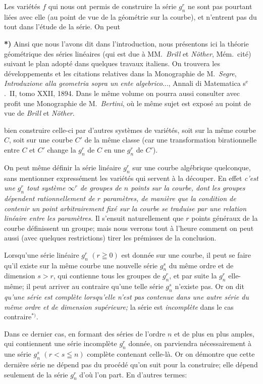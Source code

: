\documentclass{article}
\begin{document}
Les variétés $f$ qui nous ont permis de construire la série $g_{n}^{r}$ ne sont pas pourtant liées avec elle (au point de vue de la géométrie sur la courbe), et n'entrent pas du tout dans l'étude de la série. On peut

\textbf{*)} Ainsi que nous l'avons dit dans l'introduction, nous présentons ici la théorie géométrique des séries linéaires (qui est due à MM.\ \emph{Brill} et \emph{Nöther}, Mém.\ cité) suivant le plan adopté dans quelques travaux italiens. On trouvera les développements et les citations relatives dans la Monographie de M.\ \emph{Segre}, \emph{Introduzione alla geometria sopra un ente algebrico}..., Annali di Matematica s${}^{\text{e}}$.\ II, tomo XXII, 1894. Dans le même volume on pourra aussi consulter avec profit une Monographie de M.\ \emph{Bertini}, où le même sujet est exposé au point de vue de \emph{Brill} et \emph{Nöther}.

bien construire celle-ci par d'autres systèmes de variétés, soit sur la même courbe $C$, soit sur une courbe $C'$ de la même classe (car une transformation birationnelle entre $C$ et $C'$ change la $g_{n}^{r}$ de $C$ en une $g_{n}^{r}$ de $C'$).

On peut même définir la série linéaire $g_{n}^{r}$ sur une courbe algébrique quelconque, sans mentionner expressément les variétés qui servent à la découper. En effet \emph{c'est une $g_{n}^{r}$ tout système $\infty^{r}$ de groupes de $n$ points sur la courbe, dont les groupes dépendent rationnellement de $r$ paramètres, de manière que la condition de contenir un point arbitrairement fixé sur la courbe se traduise par une relation linéaire entre les paramètres.} Il s'ensuit naturellement que $r$ points généraux de la courbe définissent un groupe; mais nous verrons tout à l'heure comment on peut aussi (avec quelques restrictions) tirer les prémisses de la conclusion.

Lorsqu'une série linéaire $g_{n}^{r}$ $(r \geqq 0)$ est donnée sur une courbe, il peut se faire qu'il existe sur la même courbe une nouvelle série $g_{n}^{s}$ du même ordre et de dimension $s > r$, qui contienne tous les groupes de $g_{n}^{r}$, et par suite la $g_{n}^{r}$ elle-même; il peut arriver au contraire qu'une telle série $g_{n}^{s}$ n'existe pas. Or on dit \emph{qu'une série est complète lorsqu'elle n'est pas contenue dans une autre série du même ordre et de dimension supérieure;} la série est \emph{incomplète} dans le cas contraire${}^{*)}$.

Dans ce dernier cas, en formant des séries de l'ordre $n$ et de plus en plus amples, qui contiennent une série incomplète $g_{n}^{r}$ donnée, on parviendra nécessairement à une série $g_{n}^{s}$ $(r < s \leqq n)$ complète contenant celle-là. Or on démontre que cette dernière série ne dépend pas du procédé qu'on suit pour la construire; elle dépend seulement de la série $g_{n}^{r}$ d'où l'on part. En d'autres termes:
\end{document}
